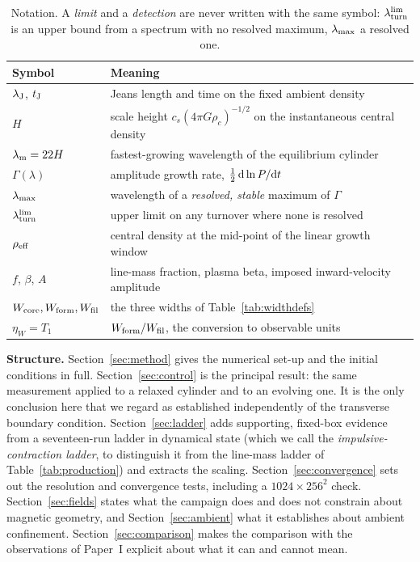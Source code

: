 \documentclass[usenatbib,twoside,twocolumn]{mnras}
\begin{document}
\begin{table}
\caption{Notation. A \emph{limit} and a \emph{detection} are never written with the same symbol: $\lambda_{\rm turn}^{\rm lim}$ is an upper bound from a spectrum with no resolved maximum, $\lambda_{\rm max}$ a resolved one.}
\label{tab:notation}
\footnotesize
\setlength{\tabcolsep}{4pt}
\begin{tabular}{@{}lp{5.9cm}@{}}
\toprule
Symbol & Meaning \\
\midrule
$\lambda_{\rm J}$, $t_{\rm J}$ & Jeans length and time on the fixed ambient density \\
$H$ & scale height $c_s(4\pi G\rho_c)^{-1/2}$ on the instantaneous central density \\
$\lambda_{\rm m}=22H$ & fastest-growing wavelength of the equilibrium cylinder \\
$\Gamma(\lambda)$ & amplitude growth rate, $\tfrac12\,{\rm d}\ln P/{\rm d}t$ \\
$\lambda_{\rm max}$ & wavelength of a \emph{resolved, stable} maximum of $\Gamma$ \\
$\lambda_{\rm turn}^{\rm lim}$ & upper limit on any turnover where none is resolved \\
$\rho_{\rm eff}$ & central density at the mid-point of the linear growth window \\
$f$, $\beta$, $A$ & line-mass fraction, plasma beta, imposed inward-velocity amplitude \\
$W_{\rm core},W_{\rm form},W_{\rm fil}$ & the three widths of Table~\ref{tab:widthdefs} \\
$\eta_W=T_1$ & $W_{\rm form}/W_{\rm fil}$, the conversion to observable units \\
\bottomrule
\end{tabular}
\end{table}

\smallskip\noindent\textbf{Structure.} Section~\ref{sec:method} gives the numerical set-up and the initial conditions in full. Section~\ref{sec:control} is the principal result: the same measurement applied to a relaxed cylinder and to an evolving one. It is the only conclusion here that we regard as established independently of the transverse boundary condition. Section~\ref{sec:ladder} adds supporting, fixed-box evidence from a seventeen-run ladder in dynamical state (which we call the \emph{impulsive-contraction ladder}, to distinguish it from the line-mass ladder of Table~\ref{tab:production}) and extracts the scaling. Section~\ref{sec:convergence} sets out the resolution and convergence tests, including a $1024\times256^2$ check. Section~\ref{sec:fields} states what the campaign does and does not constrain about magnetic geometry, and Section~\ref{sec:ambient} what it establishes about ambient confinement. Section~\ref{sec:comparison} makes the comparison with the observations of Paper~I explicit about what it can and cannot mean.
\end{document}
